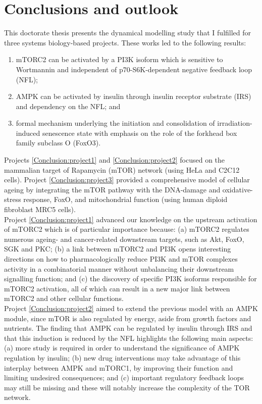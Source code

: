 \graphicspath{{Chapter8/Chapter8Figs/}}

\chapter{Conclusions and outlook}
\label{chap:Conclusions and outlook}
This doctorate thesis presents the dynamical modelling study that I fulfilled for three systems biology-based projects. These works led to the following results:
\begin{enumerate}
 \item\label{Conclusion:project1} mTORC2 can be activated by a PI3K isoform which is sensitive to Wortmannin and independent of p70-S6K-dependent negative feedback loop (NFL);
 \item\label{Conclusion:project2} AMPK can be activated by insulin through insulin receptor substrate (IRS) and dependency on the NFL; and 
 \item\label{Conclusion:project3} formal mechanism underlying the initiation and consolidation of irradiation-induced senescence state with emphasis on the role of the forkhead box family subclass O (FoxO3).
\end{enumerate}
Projects \ref{Conclusion:project1} and \ref{Conclusion:project2} focused on the mammalian target of Rapamycin (mTOR) network (using HeLa and C2C12 cells). Project \ref{Conclusion:project3} provided a comprehensive model of cellular ageing by integrating the mTOR pathway with the DNA-damage and oxidative-stress response, FoxO, and mitochondrial function (using human diploid fibroblast MRC5 cells).\\
Project \ref{Conclusion:project1} advanced our knowledge on the upstream activation of mTORC2 which is of particular importance because: (a) mTORC2 regulates numerous ageing- and cancer-related downstream targets, such as Akt, FoxO, SGK and PKC; (b) a link between mTORC2 and PI3K opens interesting directions on how to pharmacologically reduce PI3K and mTOR complexes activity in a combinatorial manner without unbalancing their downstream signalling function; and (c) the discovery of specific PI3K isoforms responsible for mTORC2 activation, all of which can result in a new major link between mTORC2 and other cellular functions.\\
Project \ref{Conclusion:project2} aimed to extend the previous model with an AMPK module, since mTOR is also regulated by energy, aside from growth factors and nutrients. The finding that AMPK can be regulated by insulin through IRS and that this induction is reduced by the NFL highlights the following main aspects: (a) more study is required in order to understand the significance of AMPK regulation by insulin; (b) new drug interventions may take advantage of this interplay between AMPK and mTORC1, by improving their function and limiting undesired consequences; and (c) important regulatory feedback loops may still be missing and these will notably increase the complexity of the TOR network.\\
